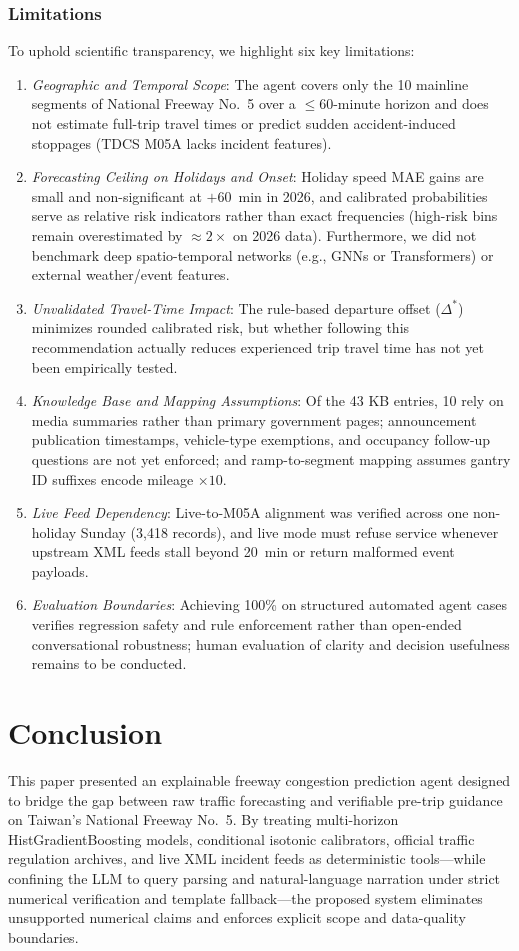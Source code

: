 \documentclass[conference]{IEEEtran}
\begin{document}
\subsubsection{Limitations}
To uphold scientific transparency, we highlight six key limitations:
\begin{enumerate}
    \item \emph{Geographic and Temporal Scope}: The agent covers only the 10 mainline segments of National Freeway No.~5 over a $\le 60$-minute horizon and does not estimate full-trip travel times or predict sudden accident-induced stoppages (TDCS M05A lacks incident features).
    \item \emph{Forecasting Ceiling on Holidays and Onset}: Holiday speed MAE gains are small and non-significant at $+60$~min in 2026, and calibrated probabilities serve as relative risk indicators rather than exact frequencies (high-risk bins remain overestimated by $\approx 2\times$ on 2026 data). Furthermore, we did not benchmark deep spatio-temporal networks (e.g., GNNs or Transformers) or external weather/event features.
    \item \emph{Unvalidated Travel-Time Impact}: The rule-based departure offset ($\Delta^*$) minimizes rounded calibrated risk, but whether following this recommendation actually reduces experienced trip travel time has not yet been empirically tested.
    \item \emph{Knowledge Base and Mapping Assumptions}: Of the 43 KB entries, 10 rely on media summaries rather than primary government pages; announcement publication timestamps, vehicle-type exemptions, and occupancy follow-up questions are not yet enforced; and ramp-to-segment mapping assumes gantry ID suffixes encode mileage $\times 10$.
    \item \emph{Live Feed Dependency}: Live-to-M05A alignment was verified across one non-holiday Sunday (3,418 records), and live mode must refuse service whenever upstream XML feeds stall beyond 20~min or return malformed event payloads.
    \item \emph{Evaluation Boundaries}: Achieving 100\% on structured automated agent cases verifies regression safety and rule enforcement rather than open-ended conversational robustness; human evaluation of clarity and decision usefulness remains to be conducted.
\end{enumerate}

\section{Conclusion}
This paper presented an explainable freeway congestion prediction agent designed to bridge the gap between raw traffic forecasting and verifiable pre-trip guidance on Taiwan's National Freeway No.~5. By treating multi-horizon HistGradientBoosting models, conditional isotonic calibrators, official traffic regulation archives, and live XML incident feeds as deterministic tools---while confining the LLM to query parsing and natural-language narration under strict numerical verification and template fallback---the proposed system eliminates unsupported numerical claims and enforces explicit scope and data-quality boundaries.
\end{document}

